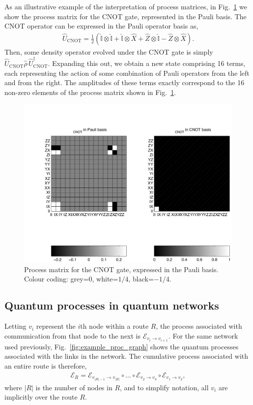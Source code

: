 \documentclass[aps,rmp,twocolumn,amsmath,amssymb,nofootinbib,superscriptaddress,longbibliography,floatfix,table-of-contents,eqsecnum]{revtex4-1}
\begin{document}
As an illustrative example of the interpretation of process matrices, in Fig.~\ref{fig:CNOT_proc_matrix} we show the process matrix for the CNOT gate, represented in the Pauli basis. The CNOT operator can be expressed in the Pauli operator basis as,
\begin{align}
\hat{U}_\text{CNOT} = \frac{1}{2}(\hat{\mathbb{I}}\otimes \hat{\mathbb{I}} + \hat{\mathbb{I}} \otimes \hat{X} + \hat{Z}\otimes \hat{\mathbb{I}} - \hat{Z}\otimes \hat{X}).
\end{align}
Then, some density operator evolved under the CNOT gate is simply \mbox{$\hat{U}_\text{CNOT}\hat\rho \,\hat{U}_\text{CNOT}^\dag$}. Expanding this out, we obtain a new state comprising 16 terms, each representing the action of some combination of Pauli operators from the left and from the right. The amplitudes of these terms exactly correspond to the 16 non-zero elements of the process matrix shown in Fig.~\ref{fig:CNOT_proc_matrix}.

\begin{figure}[!htb]
\includegraphics[width=0.7\columnwidth]{CNOT_process}
\caption{Process matrix for the CNOT gate, expressed in the Pauli basis. Colour coding: grey=0, white=$1/4$, black=$-1/4$.} \label{fig:CNOT_proc_matrix}
\end{figure}

%
%

\subsection{Quantum processes in quantum networks} \label{sec:quant_proc_in} 

Letting $v_i$ represent the $i$th node within a route $R$, the process associated with communication from that node to the next is $\mathcal{E}_{v_i\to v_{i+1}}$. For the same network used previously, Fig.~\ref{fig:example_proc_graph} shows the quantum processes associated with the links in the network. The cumulative process associated with an entire route is therefore,
\begin{align}
\mathcal{E}_R = \mathcal{E}_{{v_{|R|-1}}\to v_{|R|}} \circ \dots \circ \mathcal{E}_{v_2\to v_3} \circ \mathcal{E}_{v_1\to v_2},
\end{align}
where $|R|$ is the number of nodes in $R$, and to simplify notation, all $v_i$ are implicitly over the route $R$.
\end{document}
